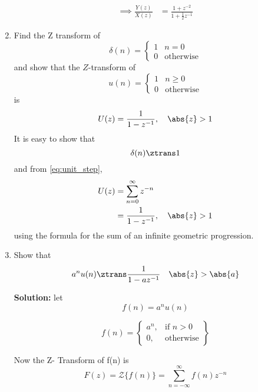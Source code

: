 \documentclass[journal,12pt,twocolumn]{IEEEtran}
\renewcommand\thesection{\arabic{section}}
\begin{document}
\begin{enumerate}[label=\thesection.\arabic*]
\begin{align}
\implies \frac{Y(z)}{X(z)} &= \frac{1 + z^{-2}}{1 + \frac{1}{2}z^{-1}}
\label{eq:freq_resp}
\end{align}
%
\item Find the Z transform of 
\begin{equation}
\delta(n)
=
\begin{cases}
1 & n = 0
\\
0 & \text{otherwise}
\end{cases}
\end{equation}
and show that the $Z$-transform of
\begin{equation}
\label{eq:unit_step}
u(n)
=
\begin{cases}
1 & n \ge 0
\\
0 & \text{otherwise}
\end{cases}
\end{equation}
is
\begin{equation}
U(z) = \frac{1}{1-z^{-1}}, \quad \abs{z} > 1
\end{equation}
\solution It is easy to show that
\begin{equation}
\delta(n) \ztrans 1
\end{equation}
and from \eqref{eq:unit_step},
\begin{align}
U(z) &= \sum _{n= 0}^{\infty}z^{-n}
\\
&=\frac{1}{1-z^{-1}}, \quad \abs{z} > 1
\end{align}
using the formula for the sum of an infinite geometric progression.
%
\item Show that 
\begin{equation}
\label{eq:anun}
a^nu(n) \ztrans \frac{1}{1-az^{-1}} \quad \abs{z} > \abs{a}
\end{equation}
%

\textbf{Solution: }
let
\begin{equation}
    f(n) = a^n u(n)
\end{equation}

\begin{equation}
f(n) = 
\left\{
    \begin{array}{lr}
        a^n, & \text{if } n>0\\
        0  , & \text{otherwise}
    \end{array}
\right\}
\end{equation}

Now the Z- Transform of f(n) is
\begin{equation}
    F(z) = {\mathcal {Z}}\{f(n)\} = \sum_{n=-\infty}^{\infty} f(n)z^{-n}
\end{equation}


\end{enumerate}
\end{document}

